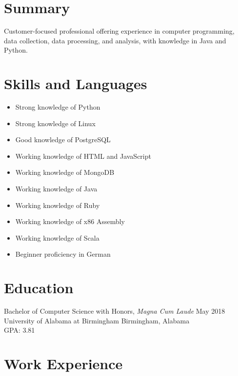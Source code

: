 \documentclass[10pt]{setzer_resume}
\begin{document}


  \section{Summary}
  Customer-focused professional offering experience in computer programming, data collection, data processing, and analysis, with knowledge in Java and Python.

  \section{Skills and Languages}

  {
  \setlength\multicolsep{0pt}
  \begin{multicols}{2}
    \noindent
    \begin{itemize}[nosep]
      \item Strong knowledge of Python
      \item Strong knowledge of Linux
      \item Good knowledge of PostgreSQL
      \item Working knowledge of HTML and JavaScript
      \item Working knowledge of MongoDB
      \item Working knowledge of Java
      \item Working knowledge of Ruby
      \item Working knowledge of x86 Assembly
      \item Working knowledge of Scala
      \item Beginner proficiency in German
    \end{itemize}
  \end{multicols}
  }

  \section{Education}
  Bachelor of Computer Science with Honors, \textit{Magna Cum Laude} \hfill May 2018 \\
  University of Alabama at Birmingham \hfill Birmingham, Alabama \\
  GPA\@: 3.81

  \section{Work Experience}

\end{document}
